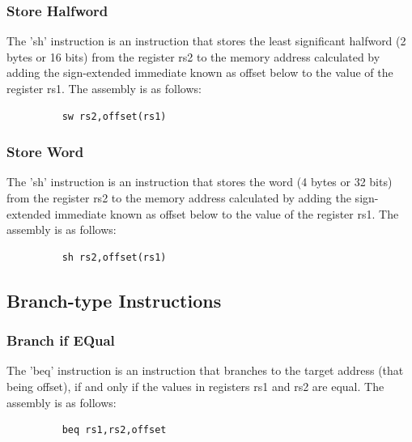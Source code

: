 \subsubsection{Store Halfword}
\qquad
The 'sh' instruction is an instruction that stores the least significant halfword (2 bytes or 16 bits) from the register rs2 to the memory address calculated by adding the sign-extended immediate known as offset below to the value of the register rs1. The assembly is as follows:
\begin{figure}[!htbp]
    \centering
    \begin{verbatim}
    sw rs2,offset(rs1)
    \end{verbatim}
\end{figure}\newline

\subsubsection{Store Word}
\qquad
The 'sh' instruction is an instruction that stores the word (4 bytes or 32 bits) from the register rs2 to the memory address calculated by adding the sign-extended immediate known as offset below to the value of the register rs1. The assembly is as follows:
\begin{figure}[!htbp]
    \centering
    \begin{verbatim}
    sh rs2,offset(rs1)
    \end{verbatim}
\end{figure}\newline


\subsection{Branch-type Instructions}

\subsubsection{Branch if EQual}
\qquad
The 'beq' instruction is an instruction that branches to the target address (that being offset), if and only if the values in registers rs1 and rs2 are equal. The assembly is as follows:
\begin{figure}[!htbp]
    \centering
    \begin{verbatim}
    beq rs1,rs2,offset
    \end{verbatim}
\end{figure}\newline

